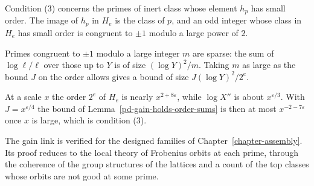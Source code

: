 Condition (3) concerns the primes of inert class whose element $h_p$ has small order. The image of
$h_p$ in $H_e$ is the class of $p$, and an odd integer whose class in $H_e$ has small order is
congruent to $\pm1$ modulo a large power of $2$.

Primes congruent to $\pm1$ modulo a large integer $m$ are sparse: the sum of $\log\ell/\ell$ over
those up to $Y$ is of size $(\log Y)^2/m$. Taking $m$ as large as the bound $J$ on the order allows
gives a bound of size $J(\log Y)^2/2^e$.

At a scale $x$ the order $2^e$ of $H_e$ is nearly $x^{2+8\varepsilon}$, while $\log X''$ is about
$x^{\varepsilon/3}$. With $J=x^{\varepsilon/4}$ the bound of Lemma~\ref{pd-gain-holds-order-sums} is
then at most $x^{-2-7\varepsilon}$ once $x$ is large, which is condition (3).

The gain link is verified for the designed families of Chapter~\ref{chapter-assembly}. Its proof
reduces to the local theory of Frobenius orbits at each prime, through the coherence of the group
structures of the lattices and a count of the top classes whose orbits are not good at some prime.

